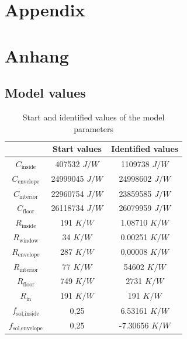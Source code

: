 

{\chapter{Appendix}}    %
{\chapter{Anhang}}      %
\label{chap:appendix}

\section{Model values}
\label{sec:appendix:Modelvalues}
\begin{table}[H]
    \centering
    \begin{tabular}{c|c|c}
         &  Start values & Identified values\\
         \hline
        $C_\text{inside}$& 407532 $J/W$ & 1109738 $J/W$\\
        $C_\text{envelope}$ & 24999045 $J/W$ & 24998602 $J/W$\\
        $C_\text{interior}$& 22960754 $J/W$ & 23859585 $J/W$\\
        $C_\text{floor}$ & 26118734 $J/W$ & 26079959 $J/W$\\
        $R_\text{inside}$ & 191 $K/W$ & 1.08710 $K/W$\\
        $R_\text{window}$ & 34 $K/W$ & 0.00251 $K/W$\\
        $R_\text{envelope}$ & 287 $K/W$ & 0,00008 $K/W$\\
        $R_\text{interior}$& 77 $K/W$ & 54602 $K/W$\\
        $R_\text{floor}$ & 749 $K/W$ & 2731 $K/W$\\
        $R_\text{in}$ & 191 $K/W$ & 191 $K/W$\\
        $f_\text{sol,inside}$ & 0,25 & 6.53161 $K/W$\\
        $f_\text{sol,envelope}$ &0,25 & -7.30656 $K/W$\\
    \end{tabular}
    \caption{Start and identified values of the model parameters}
    \label{tab:StartwerteSchätzung}
\end{table}

